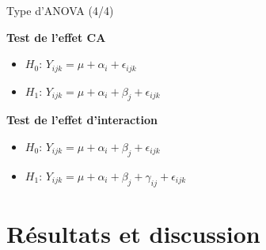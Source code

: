 \documentclass{beamer}
\begin{document}
\begin{frame}{Type d'ANOVA (4/4)}
\begin{minipage}[t]{0.32\textwidth}
		\textbf{Test de l'effet CA}
		\setlength{\leftmargini}{1em} %
		\begin{itemize}
			\setlength{\itemindent}{-1.7em} %
			\item \hspace{-0.5em}\textbf{$H_0$}: $Y_{ijk} = \mu + \alpha_i + \epsilon_{ijk}$ 
			\item \hspace{-0.5em}\textbf{$H_1$}: $Y_{ijk} = \mu + \alpha_i + \beta_j  + \epsilon_{ijk}$
		\end{itemize}
	\end{minipage}%
	\hspace{-1.5em}\vrule{} \hfill%
	\begin{minipage}[t]{0.32\textwidth}
		\textbf{Test de l'effet d'interaction}
		\setlength{\leftmargini}{1em} %
		\begin{itemize}
			\setlength{\itemindent}{-1.5em} %
			\item\hspace{-0.5em}\textbf{$H_0$}: $Y_{ijk} = \mu + \alpha_i + \beta_j + \epsilon_{ijk}$ 
			\item\hspace{-0.5em}\textbf{$H_1$}: $Y_{ijk} =\mu+ \alpha_i + \beta_j + \gamma_{ij} + \epsilon_{ijk}$
		\end{itemize}
	\end{minipage}

	
	\end{frame}
	
	\section{Résultats et discussion}
	\begin{frame}
		\tableofcontents[sections={3}]
	\end{frame}
	
\end{document}
